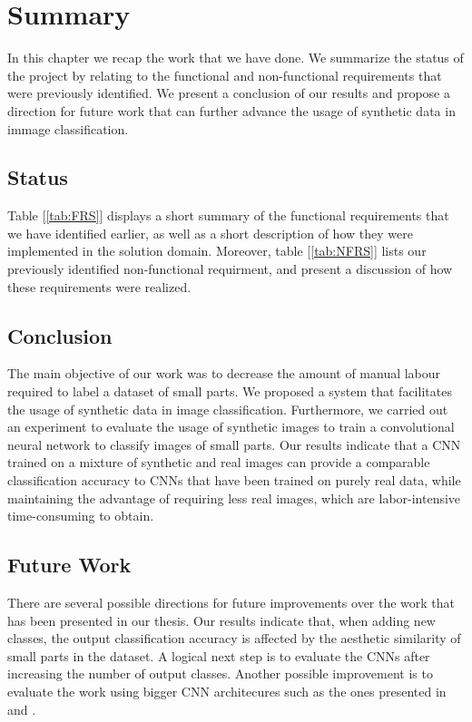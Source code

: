 \chapter{Summary}

In this chapter we recap the work that we have done. We summarize the status of the project by relating to the functional and non-functional requirements that were previously identified. We present a conclusion of our results and propose a direction for future work that can further advance the usage of synthetic data in immage classification.

\section{Status}

Table [\ref{tab:FRS}] displays a short summary of the functional requirements that we have identified earlier, as well as a short description of how they were implemented in the solution domain. Moreover, table [\ref{tab:NFRS}] lists our previously identified non-functional requirment, and present a discussion of how these requirements were realized.

\section{Conclusion}

The main objective of our work was to decrease the amount of manual labour required to label a dataset of small parts. We proposed a system that facilitates the usage of synthetic data in image classification. Furthermore, we carried out an experiment to evaluate the usage of synthetic images to train a convolutional neural network to classify images of small parts. Our results indicate that a CNN trained on a mixture of synthetic and real images can provide a comparable classification accuracy to CNNs that have been trained on purely real data, while maintaining the advantage of requiring less real images, which are labor-intensive time-consuming to obtain.

\section{Future Work}

There are several possible directions for future improvements over the work that has been presented in our thesis. Our results indicate that, when adding new classes, the output classification accuracy is affected by the aesthetic similarity of small parts in the dataset. A logical next step is to evaluate the CNNs after increasing the number of output classes. Another possible improvement is to evaluate the work using bigger CNN architecures such as the ones presented in \cite{he2016deep} and \cite{szegedy2015going}.